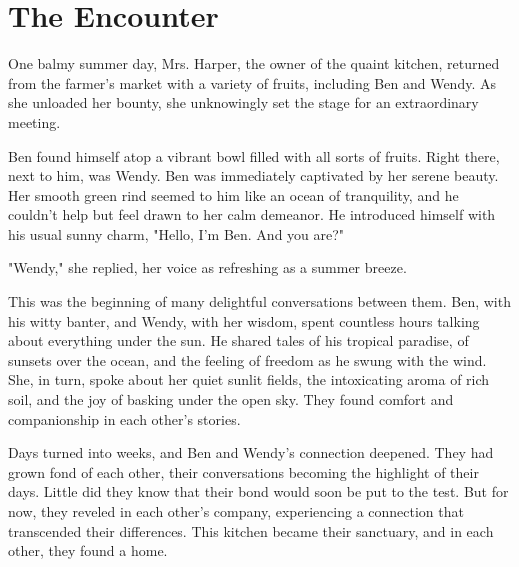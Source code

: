 \section{The Encounter}
One balmy summer day, Mrs. Harper, the owner of the quaint kitchen, returned from the farmer's market with a variety of fruits, including Ben and Wendy. As she unloaded her bounty, she unknowingly set the stage for an extraordinary meeting.

Ben found himself atop a vibrant bowl filled with all sorts of fruits. Right there, next to him, was Wendy. Ben was immediately captivated by her serene beauty. Her smooth green rind seemed to him like an ocean of tranquility, and he couldn't help but feel drawn to her calm demeanor. He introduced himself with his usual sunny charm, "Hello, I'm Ben. And you are?"

"Wendy," she replied, her voice as refreshing as a summer breeze.

This was the beginning of many delightful conversations between them. Ben, with his witty banter, and Wendy, with her wisdom, spent countless hours talking about everything under the sun. He shared tales of his tropical paradise, of sunsets over the ocean, and the feeling of freedom as he swung with the wind. She, in turn, spoke about her quiet sunlit fields, the intoxicating aroma of rich soil, and the joy of basking under the open sky. They found comfort and companionship in each other's stories.

Days turned into weeks, and Ben and Wendy's connection deepened. They had grown fond of each other, their conversations becoming the highlight of their days. Little did they know that their bond would soon be put to the test. But for now, they reveled in each other's company, experiencing a connection that transcended their differences. This kitchen became their sanctuary, and in each other, they found a home.
